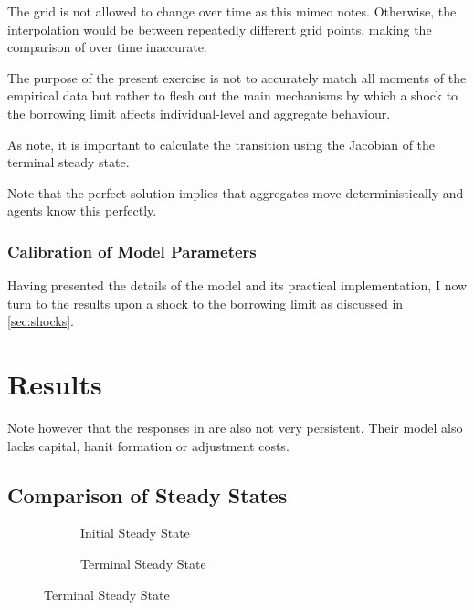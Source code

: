 \documentclass[12pt]{article} %
\numberwithin{equation}{section} %
\begin{document}
The grid is not allowed to change over time as this mimeo notes. Otherwise, the interpolation would be between repeatedly different grid points, making the comparison of over time inaccurate. 

The purpose of the present exercise is not to accurately match all moments of the empirical data but rather to flesh out the main mechanisms by which a shock to the borrowing limit affects individual-level and aggregate behaviour.

As \textcite{auclert2021} note, it is important to calculate the transition using the Jacobian of the terminal steady state.

Note that the perfect solution implies that aggregates move deterministically and agents know this perfectly.

\subsubsection*{Calibration of Model Parameters}
\label{sec:calibration}

Having presented the details of the model and its practical implementation, I now turn to the results upon a shock to the borrowing limit as discussed in \ref{sec:shocks}.

\section{Results}
\label{sec:results}

Note however that the responses in \textcite{gl2017} are also not very persistent. Their model also lacks capital, hanit formation or adjustment costs.

\subsection{Comparison of Steady States}
\label{sec:results-stst}

\begin{figure}[H]
    \centering
    \caption{Consumption Policies Across Steady States}
    \label{fig:c-policies-across-stst}
    \begin{subfigure}[b]{0.49\textwidth}
         \centering
         \caption{Initial Steady State}
         
         \label{fig:c-policies-initial}
     \end{subfigure}
     \hfill
     \begin{subfigure}[b]{0.49\textwidth}
         \centering
         \caption{Terminal Steady State}
         
         \label{fig:c-policies-terminal}
     \end{subfigure}
    \begin{footnotesize}
	\begin{flushleft}
	\end{flushleft}
	\end{footnotesize}
\end{figure}
\end{document}
